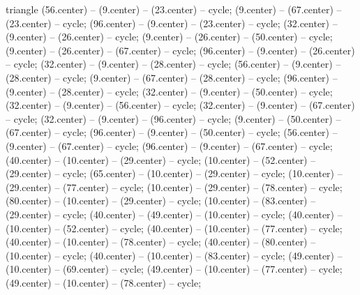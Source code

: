 {\begin{pgfonlayer}{triangle}
 (56.center) -- (9.center) -- (23.center) -- cycle; 
 (9.center) -- (67.center) -- (23.center) -- cycle; 
 (96.center) -- (9.center) -- (23.center) -- cycle; 
 (32.center) -- (9.center) -- (26.center) -- cycle; 
 (9.center) -- (26.center) -- (50.center) -- cycle; 
 (9.center) -- (26.center) -- (67.center) -- cycle; 
 (96.center) -- (9.center) -- (26.center) -- cycle; 
 (32.center) -- (9.center) -- (28.center) -- cycle; 
 (56.center) -- (9.center) -- (28.center) -- cycle; 
 (9.center) -- (67.center) -- (28.center) -- cycle; 
 (96.center) -- (9.center) -- (28.center) -- cycle; 
 (32.center) -- (9.center) -- (50.center) -- cycle; 
 (32.center) -- (9.center) -- (56.center) -- cycle; 
 (32.center) -- (9.center) -- (67.center) -- cycle; 
 (32.center) -- (9.center) -- (96.center) -- cycle; 
 (9.center) -- (50.center) -- (67.center) -- cycle; 
 (96.center) -- (9.center) -- (50.center) -- cycle; 
 (56.center) -- (9.center) -- (67.center) -- cycle; 
 (96.center) -- (9.center) -- (67.center) -- cycle; 
 (40.center) -- (10.center) -- (29.center) -- cycle; 
 (10.center) -- (52.center) -- (29.center) -- cycle; 
 (65.center) -- (10.center) -- (29.center) -- cycle; 
 (10.center) -- (29.center) -- (77.center) -- cycle; 
 (10.center) -- (29.center) -- (78.center) -- cycle; 
 (80.center) -- (10.center) -- (29.center) -- cycle; 
 (10.center) -- (83.center) -- (29.center) -- cycle; 
 (40.center) -- (49.center) -- (10.center) -- cycle; 
 (40.center) -- (10.center) -- (52.center) -- cycle; 
 (40.center) -- (10.center) -- (77.center) -- cycle; 
 (40.center) -- (10.center) -- (78.center) -- cycle; 
 (40.center) -- (80.center) -- (10.center) -- cycle; 
 (40.center) -- (10.center) -- (83.center) -- cycle; 
 (49.center) -- (10.center) -- (69.center) -- cycle; 
 (49.center) -- (10.center) -- (77.center) -- cycle; 
 (49.center) -- (10.center) -- (78.center) -- cycle; 

\end{pgfonlayer}}

